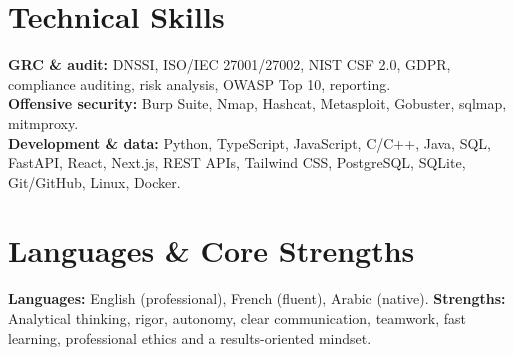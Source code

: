\documentclass[10pt,a4paper]{article}
\begin{document}
\section*{Technical Skills}
\textbf{GRC \& audit:} DNSSI, ISO/IEC 27001/27002, NIST CSF 2.0, GDPR, compliance auditing, risk analysis, OWASP Top 10, reporting.\\[-1pt]
\textbf{Offensive security:} Burp Suite, Nmap, Hashcat, Metasploit, Gobuster, sqlmap, mitmproxy.\\[-1pt]
\textbf{Development \& data:} Python, TypeScript, JavaScript, C/C++, Java, SQL, FastAPI, React, Next.js, REST APIs, Tailwind CSS, PostgreSQL, SQLite, Git/GitHub, Linux, Docker.

\section*{Languages \& Core Strengths}
\textbf{Languages:} English (professional), French (fluent), Arabic (native). \quad
\textbf{Strengths:} Analytical thinking, rigor, autonomy, clear communication, teamwork, fast learning, professional ethics and a results-oriented mindset.
\end{document}
